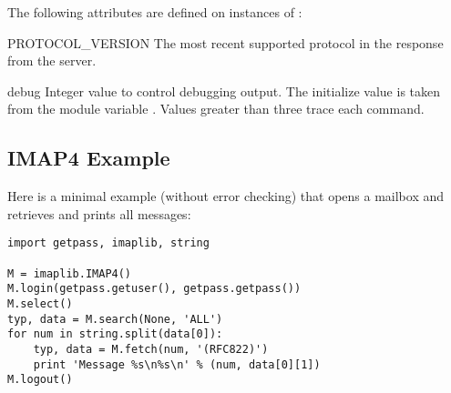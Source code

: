 The following attributes are defined on instances of :


\begin{memberdesc}{PROTOCOL_VERSION}
The most recent supported protocol in the
 response from the server.
\end{memberdesc}

\begin{memberdesc}{debug}
Integer value to control debugging output.  The initialize value is
taken from the module variable .  Values greater than
three trace each command.
\end{memberdesc}


\subsection{IMAP4 Example \label{imap4-example}}

Here is a minimal example (without error checking) that opens a
mailbox and retrieves and prints all messages:

\begin{verbatim}
import getpass, imaplib, string

M = imaplib.IMAP4()
M.login(getpass.getuser(), getpass.getpass())
M.select()
typ, data = M.search(None, 'ALL')
for num in string.split(data[0]):
    typ, data = M.fetch(num, '(RFC822)')
    print 'Message %s\n%s\n' % (num, data[0][1])
M.logout()
\end{verbatim}
